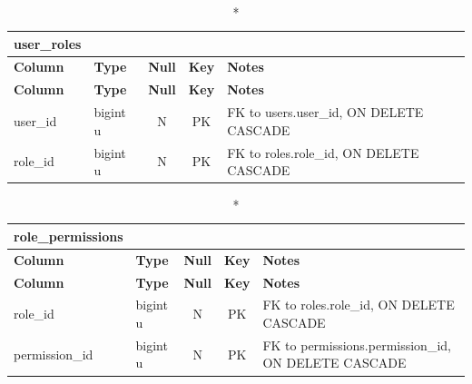 \vspace{-0.4em}
\begin{longtable}{@{}p{3.4cm}p{2.9cm}c c p{5.6cm}@{}}
\caption*{\textbf{user\_\allowbreak{}roles}}\\
\toprule \textbf{Column} & \textbf{Type} & \textbf{Null} & \textbf{Key} & \textbf{Notes} \\ \midrule \endfirsthead
\toprule \textbf{Column} & \textbf{Type} & \textbf{Null} & \textbf{Key} & \textbf{Notes} \\ \midrule \endhead
\bottomrule \endlastfoot
user\_\allowbreak{}id & bigint u & N & PK & FK to users.user\_\allowbreak{}id, ON DELETE CASCADE \\
role\_\allowbreak{}id & bigint u & N & PK & FK to roles.role\_\allowbreak{}id, ON DELETE CASCADE \\
\end{longtable}
\vspace{-0.4em}
\begin{longtable}{@{}p{3.4cm}p{2.9cm}c c p{5.6cm}@{}}
\caption*{\textbf{role\_\allowbreak{}permissions}}\\
\toprule \textbf{Column} & \textbf{Type} & \textbf{Null} & \textbf{Key} & \textbf{Notes} \\ \midrule \endfirsthead
\toprule \textbf{Column} & \textbf{Type} & \textbf{Null} & \textbf{Key} & \textbf{Notes} \\ \midrule \endhead
\bottomrule \endlastfoot
role\_\allowbreak{}id & bigint u & N & PK & FK to roles.role\_\allowbreak{}id, ON DELETE CASCADE \\
permission\_\allowbreak{}id & bigint u & N & PK & FK to permissions.permission\_\allowbreak{}id, ON DELETE CASCADE \\
\end{longtable}
\vspace{-0.4em}
